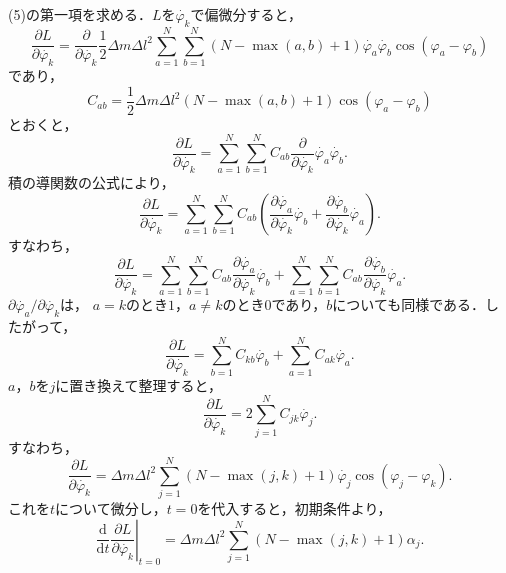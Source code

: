 \documentclass[11pt, a4paper]{ltjsarticle}
\begin{document}
(5)の第一項を求める．$L$を$\dot{\varphi_k}$で偏微分すると，
\begin{equation*}
  \frac{\partial L}{\partial \dot{\varphi_k}}
  = \frac{\partial}{\partial \dot{\varphi_k}}
    \frac{1}{2} \Delta m {\Delta l}^2
    \sum_{a = 1}^{N} \sum_{b = 1}^{N} \left(N - \max \left(a, b\right) + 1\right)
    \dot{\varphi_a} \dot{\varphi_b} \cos \left(\varphi_a - \varphi_b\right)
\end{equation*}
であり，
\begin{equation*}
  C_{ab} = \frac{1}{2} \Delta m {\Delta l}^2 \left(N - \max \left(a, b\right) + 1\right)
           \cos \left(\varphi_a - \varphi_b\right)
\end{equation*}
とおくと，
\begin{equation*}
  \frac{\partial L}{\partial \dot{\varphi_k}}
  = \sum_{a = 1}^{N} \sum_{b = 1}^{N} C_{ab}
    \frac{\partial}{\partial \dot{\varphi_k}} \dot{\varphi_a} \dot{\varphi_b}.
\end{equation*}
積の導関数の公式により，
\begin{equation*}
  \frac{\partial L}{\partial \dot{\varphi_k}}
  = \sum_{a = 1}^{N} \sum_{b = 1}^{N} C_{ab}
    \left(\frac{\partial \dot{\varphi_a}}{\partial \dot{\varphi_k}} \dot{\varphi_b}
        + \frac{\partial \dot{\varphi_b}}{\partial \dot{\varphi_k}} \dot{\varphi_a}\right).
\end{equation*}
すなわち，
\begin{equation*}
  \frac{\partial L}{\partial \dot{\varphi_k}}
  = \sum_{a = 1}^{N} \sum_{b = 1}^{N} C_{ab}
    \frac{\partial \dot{\varphi_a}}{\partial \dot{\varphi_k}} \dot{\varphi_b}
  + \sum_{a = 1}^{N} \sum_{b = 1}^{N} C_{ab}
    \frac{\partial \dot{\varphi_b}}{\partial \dot{\varphi_k}} \dot{\varphi_a}.
\end{equation*}
$\partial \dot{\varphi_a}/\partial \dot{\varphi_k}$は，
$a = k$のとき$1$，$a \neq k$のとき$0$であり，$b$についても同様である．したがって，
\begin{equation*}
  \frac{\partial L}{\partial \dot{\varphi_k}}
  = \sum_{b = 1}^{N} C_{kb} \dot{\varphi_b} + \sum_{a = 1}^{N} C_{ak} \dot{\varphi_a}.
\end{equation*}
$a$，$b$を$j$に置き換えて整理すると，
\begin{equation*}
  \frac{\partial L}{\partial \dot{\varphi_k}} = 2 \sum_{j = 1}^{N} C_{jk} \dot{\varphi_j}.
\end{equation*}
すなわち，
\begin{equation*}
  \frac{\partial L}{\partial \dot{\varphi_k}}
  = \Delta m {\Delta l}^2 \sum_{j = 1}^{N}
    \left(N - \max \left(j, k\right) + 1\right) \dot{\varphi_j}
    \cos \left(\varphi_j - \varphi_k\right).
\end{equation*}
これを$t$について微分し，$t = 0$を代入すると，初期条件より，
\begin{equation}
  \left.\frac{\mathrm{d}}{\mathrm{d}t} \frac{\partial L}{\partial \dot{\varphi_k}}\right|_{t = 0}
  = \Delta m {\Delta l}^2 \sum_{j = 1}^{N}
    \left(N - \max \left(j, k\right) + 1\right) \alpha_j.
\end{equation}
\end{document}
